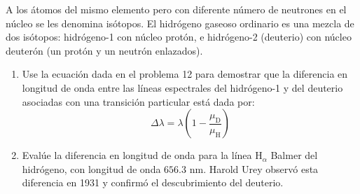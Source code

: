 \item A los átomos del mismo elemento pero con diferente número de neutrones en el núcleo se les denomina isótopos. El hidrógeno gaseoso ordinario es una mezcla de dos isótopos: hidrógeno-1 con núcleo protón, e hidrógeno-2 (deuterio) con núcleo deuterón (un protón y un neutrón enlazados).
\begin{enumerate}
    \item Use la ecuación dada en el problema 12 para demostrar que la diferencia en longitud de onda entre las líneas espectrales del hidrógeno-1 y del deuterio asociadas con una transición particular está dada por:
    $$ \Delta\lambda = \lambda \left( 1 - \frac{\mu_{\text{D}}}{\mu_{\text{H}}} \right) $$
    \item Evalúe la diferencia en longitud de onda para la línea $\text{H}_\alpha$ Balmer del hidrógeno, con longitud de onda $656.3\text{ nm}$. Harold Urey observó esta diferencia en 1931 y confirmó el descubrimiento del deuterio.
\end{enumerate}